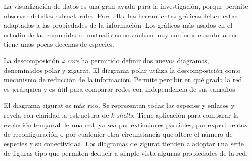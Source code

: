 La visualización de datos es una gran ayuda para la investigación, porque permite observar detalles estructurales. Para ello, las herramientas gráficas deben estar adaptadas a las propiedades de la información. Los gráficos más usados en el estudio de las comunidades mutualistas se vuelven muy confusos cuando la red tiene unas pocas decenas de especies. 

La descomposición \textit{k core} ha permitido definir dos nuevos diagramas, denominados polar y zigurat. El diagrama polar utiliza la descomposición
como mecanismo de reducción de la información. Permite percibir en qué grado la red es jerárquica y es útil para comparar redes con independencia de sus tamaños.

El diagrama zigurat es más rico. Se representan todas las especies y enlaces y revela con claridad la estructura de \textit{k shells}. Tiene aplicación para comparar la evolución temporal de una red, ya sea por extinciones parciales, por experimentos de reconfiguración o por cualquier otra circunstancia que altere el número de especies y su conectividad. Los diagramas de zigurat tienden a adoptar una serie de figuras tipo que permiten deducir a simple vista algunas propiedades de la red.

\clearpage
